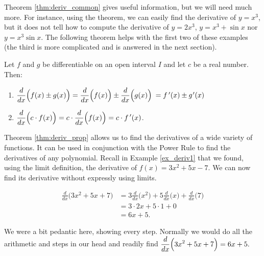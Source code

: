 Theorem \ref{thm:deriv_common} gives useful information, but we will need much more. For instance, using the theorem, we can easily find the derivative of $y=x^3$, but it does not tell how to compute the derivative of $y=2x^3$, $y=x^3+\sin x$ nor $y=x^3\sin x$. The following theorem helps with the first two of these examples (the third is more complicated and is answered in the next section).
\enlargethispage{\baselineskip}

{Let $f$ and $g$ be differentiable on an open interval $I$ and let $c$ be a real number. Then:
	\begin{enumerate}
	\item	{}
	
	$\displaystyle \frac{d}{dx}\Big(f(x) \pm g(x)\Big) = \frac{d}{dx}\Big(f(x)\Big) \pm \frac{d}{dx}\Big(g(x)\Big)$ $= \rule{0pt}{15pt}\fp(x)\pm g\primeskip'(x)$
	\item		{}
	
	$\displaystyle \frac{d}{dx}\Big(c\cdot f(x)\Big) = c\cdot\frac{d}{dx}\Big(f(x)\Big) = c\cdot f\,'(x)$.
	\end{enumerate}
}

Theorem \ref{thm:deriv_prop} allows us to find the derivatives of a wide variety of functions. It can be used in conjunction with the Power Rule to find the derivatives of any polynomial. Recall in Example \ref{ex_deriv1} that we found, using the limit definition, the derivative of $f(x) = 3x^2+5x-7$. We can now find its derivative without expressly using limits.\\

{
		\begin{align*}
		\frac{d}{dx}\Big(3x^2+5x+7\Big) &= 3\frac{d}{dx}\Big(x^2\Big) + 5\frac{d}{dx}\Big(x\Big) + \frac{d}{dx}\Big(7\Big) \\
																		&= 3\cdot 2x+5\cdot 1+ 0\\
																		&= 6x+5.
		\end{align*}

We were a bit pedantic here, showing every step. Normally we would do all the arithmetic and steps in our head and readily find $\displaystyle \frac{d}{dx}\Big(3x^2+5x+7\Big) = 6x+5.$
}\\

